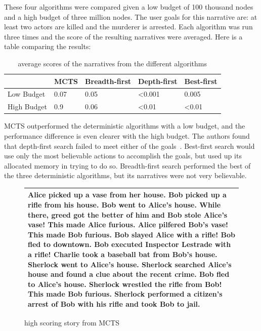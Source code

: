\documentclass{sig-alternate}
\begin{document}
These four algorithms were compared given a low budget of 100 thousand nodes and a high budget of three million nodes. The user goals for this narrative are: at least two actors are killed and the murderer is arrested. Each algorithm was run three times and the score of the resulting narratives were averaged. Here is a table comparing the results: 

\begin{table}[h]
\centering
	\begin{tabular}{ m{0.45in} | m{0.45in} | m{0.45in} | m{0.45in} | m{0.45in} |}	 
	 & MCTS & Breadth-first & Depth-first & Best-first \\ \hline
Low Budget & 0.07 & 0.05 & <0.001 & 0.005 \\ \hline
High Budget & 0.9 & 0.06 & <0.01 & <0.01 \\ \hline
	\end{tabular}
	\caption[Table caption text]{average scores of the narratives from the different algorithms}
\end{table}

MCTS outperformed the deterministic algorithms with a low budget, and the performance difference is even clearer with the high budget. The authors found that depth-first search failed to meet either of the goals~\cite{Narrative}. Best-first search would use only the most believable actions to accomplish the goals, but used up its allocated memory in trying to do so. Breadth-first search performed the best of the three deterministic algorithms, but its narratives were not very believable.

\begin{figure}[h]
\begin{tabular}{|p{8cm}|}
\hline
Alice picked up a vase from her house. Bob picked up a rifle from his house. Bob went to Alice's house. While there, greed got the better of him and Bob stole Alice's vase! This made Alice furious. Alice pilfered Bob's vase! This made Bob furious. Bob slayed Alice with a rifle! Bob fled to downtown. Bob executed Inspector Lestrade with a rifle! Charlie took a baseball bat from Bob's house. Sherlock went to Alice's house. Sherlock searched Alice's house and found a clue about the recent crime. Bob fled to Alice's house. Sherlock wrestled the rifle from Bob! This made Bob furious. Sherlock performed a citizen's arrest of Bob with his rifle and took Bob to jail. \\ \hline
\end{tabular}
\centering
\caption{high scoring story from MCTS}
\label{fig:GoodStory}
\end{figure}
\end{document}
